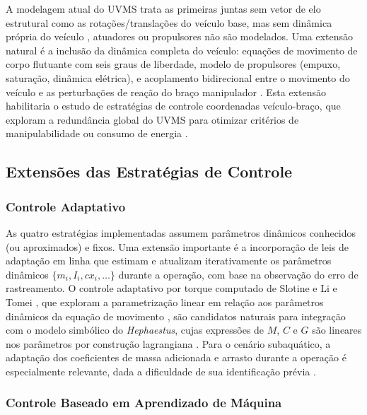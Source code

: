 A modelagem atual do UVMS trata as primeiras juntas sem vetor de elo estrutural como as rotações/translações do veículo base, mas sem dinâmica própria do veículo , atuadores ou propulsores não são modelados. Uma extensão natural é a inclusão da dinâmica completa do veículo: equações de movimento de corpo flutuante com seis graus de liberdade, modelo de propulsores (empuxo, saturação, dinâmica elétrica), e acoplamento bidirecional entre o movimento do veículo e as perturbações de reação do braço manipulador \cite{fossen2011handbook, antonelli2014modelling}. Esta extensão habilitaria o estudo de estratégias de controle coordenadas veículo-braço, que exploram a redundância global do UVMS para otimizar critérios de manipulabilidade ou consumo de energia \cite{yuh2001underwater, chiaverini1997singularity}.

\subsection{Extensões das Estratégias de Controle}

\subsubsection*{Controle Adaptativo}

As quatro estratégias implementadas assumem parâmetros dinâmicos conhecidos (ou aproximados) e fixos. Uma extensão importante é a incorporação de leis de adaptação em linha que estimam e atualizam iterativamente os parâmetros dinâmicos $\{m_i, I_i, cx_i, \ldots\}$ durante a operação, com base na observação do erro de rastreamento. O controle adaptativo por torque computado de Slotine e Li \cite{slotine1987adaptive} e Tomei \cite{tomei2002simple} , que exploram a parametrização linear em relação aos parâmetros dinâmicos da equação de movimento , são candidatos naturais para integração com o modelo simbólico do \textit{Hephaestus}, cujas expressões de $M$, $C$ e $G$ são lineares nos parâmetros por construção lagrangiana \cite{siciliano2009robotics, spong2020robot}. Para o cenário subaquático, a adaptação dos coeficientes de massa adicionada e arrasto durante a operação é especialmente relevante, dada a dificuldade de sua identificação prévia \cite{antonelli2014modelling, aldhaheri2022underwater}.

\subsubsection*{Controle Baseado em Aprendizado de Máquina}

